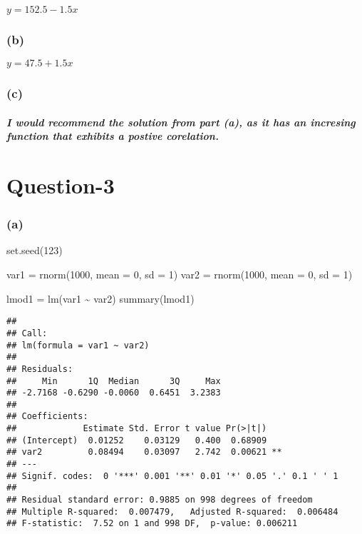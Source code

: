 \documentclass[
]{article}
\newenvironment{Shaded}{\begin{snugshade}}{\end{snugshade}}
\newcommand{\AttributeTok}[1]{\textcolor[rgb]{0.77,0.63,0.00}{#1}}
\newcommand{\DecValTok}[1]{\textcolor[rgb]{0.00,0.00,0.81}{#1}}
\newcommand{\FunctionTok}[1]{\textcolor[rgb]{0.00,0.00,0.00}{#1}}
\newcommand{\NormalTok}[1]{#1}
\newcommand{\OtherTok}[1]{\textcolor[rgb]{0.56,0.35,0.01}{#1}}
\newcommand{\SpecialCharTok}[1]{\textcolor[rgb]{0.00,0.00,0.00}{#1}}
\begin{document}
\(y = 152.5 - 1.5x\)

\hypertarget{b-1}{%
\subsubsection{(b)}\label{b-1}}

\(y = 47.5 + 1.5x\)

\hypertarget{c-1}{%
\subsubsection{(c)}\label{c-1}}

\hypertarget{i-would-recommend-the-solution-from-part-a-as-it-has-an-incresing-function-that-exhibits-a-postive-corelation.}{%
\subparagraph{I would recommend the solution from part (a), as it has an
incresing function that exhibits a postive
corelation.}\label{i-would-recommend-the-solution-from-part-a-as-it-has-an-incresing-function-that-exhibits-a-postive-corelation.}}

\hypertarget{question-3}{%
\section{Question-3}\label{question-3}}

\hypertarget{a-2}{%
\subsubsection{(a)}\label{a-2}}

\begin{Shaded}
\begin{Highlighting}[]
\FunctionTok{set.seed}\NormalTok{(}\DecValTok{123}\NormalTok{)}

\NormalTok{var1 }\OtherTok{=} \FunctionTok{rnorm}\NormalTok{(}\DecValTok{1000}\NormalTok{, }\AttributeTok{mean =} \DecValTok{0}\NormalTok{, }\AttributeTok{sd =} \DecValTok{1}\NormalTok{)}
\NormalTok{var2 }\OtherTok{=} \FunctionTok{rnorm}\NormalTok{(}\DecValTok{1000}\NormalTok{, }\AttributeTok{mean =} \DecValTok{0}\NormalTok{, }\AttributeTok{sd =} \DecValTok{1}\NormalTok{)}

\NormalTok{lmod1 }\OtherTok{=} \FunctionTok{lm}\NormalTok{(var1 }\SpecialCharTok{\textasciitilde{}}\NormalTok{ var2)}
\FunctionTok{summary}\NormalTok{(lmod1)}
\end{Highlighting}
\end{Shaded}

\begin{verbatim}
## 
## Call:
## lm(formula = var1 ~ var2)
## 
## Residuals:
##     Min      1Q  Median      3Q     Max 
## -2.7168 -0.6290 -0.0060  0.6451  3.2383 
## 
## Coefficients:
##             Estimate Std. Error t value Pr(>|t|)   
## (Intercept)  0.01252    0.03129   0.400  0.68909   
## var2         0.08494    0.03097   2.742  0.00621 **
## ---
## Signif. codes:  0 '***' 0.001 '**' 0.01 '*' 0.05 '.' 0.1 ' ' 1
## 
## Residual standard error: 0.9885 on 998 degrees of freedom
## Multiple R-squared:  0.007479,   Adjusted R-squared:  0.006484 
## F-statistic:  7.52 on 1 and 998 DF,  p-value: 0.006211
\end{verbatim}
\end{document}

